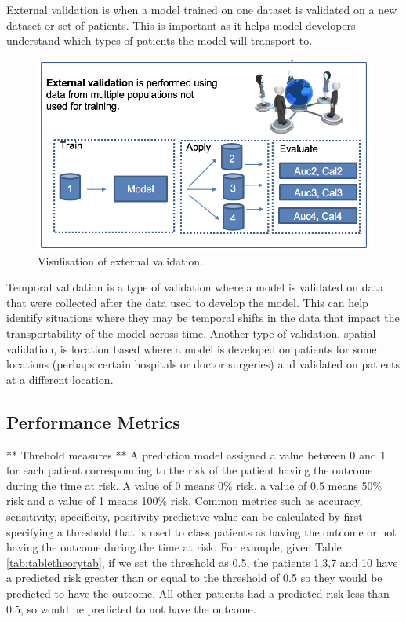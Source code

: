 \documentclass[11pt]{book}
\theoremstyle{definition}
\theoremstyle{definition}
\theoremstyle{definition}
\theoremstyle{remark}
\begin{document}
External validation is when a model trained on one dataset is validated on a new dataset or set of patients. This is important as it helps model developers understand which types of patients the model will transport to.

\begin{figure}
\includegraphics[width=1\linewidth]{images/PatientLevelPrediction/theory/externalValidation} \caption{Visulisation of external validation.}\label{fig:figuretheoryextval}
\end{figure}

Temporal validation is a type of validation where a model is validated on data that were collected after the data used to develop the model. This can help identify situations where they may be temporal shifts in the data that impact the transportability of the model across time. Another type of validation, spatial validation, is location based where a model is developed on patients for some locations (perhaps certain hospitals or doctor surgeries) and validated on patients at a different location.

\hypertarget{performance}{%
\subsection{Performance Metrics}\label{performance}}

** Threhold measures **
A prediction model assigned a value between 0 and 1 for each patient corresponding to the risk of the patient having the outcome during the time at risk. A value of 0 means 0\% risk, a value of 0.5 means 50\% risk and a value of 1 means 100\% risk. Common metrics such as accuracy, sensitivity, specificity, positivity predictive value can be calculated by first specifying a threshold that is used to class patients as having the outcome or not having the outcome during the time at risk. For example, given Table \ref{tab:tabletheorytab}, if we set the threshold as 0.5, the patients 1,3,7 and 10 have a predicted risk greater than or equal to the threshold of 0.5 so they would be predicted to have the outcome. All other patients had a predicted risk less than 0.5, so would be predicted to not have the outcome.
\end{document}

